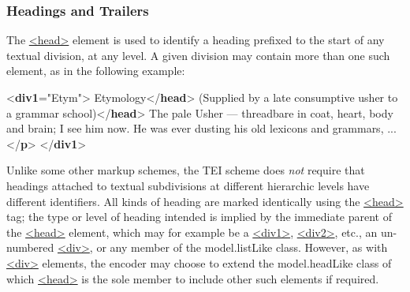 \subsubsection[{Headings and Trailers}]{Headings and Trailers}\label{DSHD}\par
The \hyperref[TEI.head]{<head>} element is used to identify a heading prefixed to the start of any textual division, at any level. A given division may contain more than one such element, as in the following example: \par\bgroup{}\exampleFont \begin{shaded}\noindent\mbox{}{<\textbf{div1}\hspace*{1em}{n}="{Etym}">}\mbox{}\newline 
{}Etymology{</\textbf{head}>}\mbox{}\newline 
{}(Supplied by a late consumptive usher to a\mbox{}\newline 
\hspace*{1em}\hspace*{1em} grammar school){</\textbf{head}>}\mbox{}\newline 
{}The pale Usher — threadbare in coat, heart,\mbox{}\newline 
\hspace*{1em}\hspace*{1em} body and brain; I see him now. He was ever\mbox{}\newline 
\hspace*{1em}\hspace*{1em} dusting his old lexicons and grammars, ...{</\textbf{p}>}\mbox{}\newline 
{</\textbf{div1}>}\end{shaded}\egroup\par \noindent  \par
Unlike some other markup schemes, the TEI scheme does \textit{not} require that headings attached to textual subdivisions at different hierarchic levels have different identifiers. All kinds of heading are marked identically using the \hyperref[TEI.head]{<head>} tag; the type or level of heading intended is implied by the immediate parent of the \hyperref[TEI.head]{<head>} element, which may for example be a \hyperref[TEI.div1]{<div1>}, \hyperref[TEI.div2]{<div2>}, etc., an un-numbered \hyperref[TEI.div]{<div>}, or any member of the \textsf{model.listLike} class. However, as with \hyperref[TEI.div]{<div>} elements, the encoder may choose to extend the \textsf{model.headLike} class of which \hyperref[TEI.head]{<head>} is the sole member to include other such elements if required.\par
